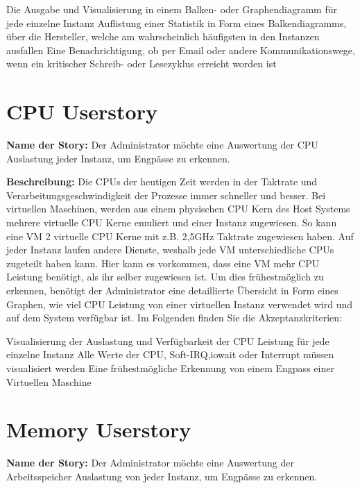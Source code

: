\begin{outline}
  \1 Die Ausgabe und Visualisierung in einem Balken- oder Graphendiagramm
  für jede einzelne Instanz
  \1 Auflistung einer Statistik in Form eines Balkendiagramms, über die
  Hersteller, welche am wahrscheinlich häufigsten in den Instanzen ausfallen
  \1 Eine Benachrichtigung, ob per Email oder andere Kommunikationswege,
  wenn ein kritischer Schreib- oder Lesezyklus erreicht worden ist
\end{outline}
\mr%

\section{CPU Userstory}
\label{section:CPU_Userstory}
\textbf{Name der Story:} Der Administrator möchte eine Auswertung der CPU
Auslastung jeder Instanz, um Engpässe zu erkennen.

\textbf{Beschreibung:} Die CPUs der heutigen Zeit werden in der Taktrate und
Verarbeitungsgeschwindigkeit der Prozesse immer schneller und besser. Bei
virtuellen Maschinen, werden aus einem physischen CPU Kern des Host Systems
mehrere virtuelle CPU Kerne emuliert und einer Instanz zugewiesen. So kann eine
VM 2 virtuelle CPU Kerne mit z.B. 2,5\si{\giga\hertz} Taktrate zugewiesen
haben.  Auf jeder Instanz laufen andere Dienste, weshalb jede VM
unterschiedliche CPUs zugeteilt haben kann. Hier kann es vorkommen, dass eine
VM mehr CPU Leistung benötigt, als ihr selber zugewiesen ist. Um dies
frühestmöglich zu erkennen, benötigt der Administrator eine detaillierte
Übersicht in Form eines Graphen, wie viel CPU Leistung von einer virtuellen
Instanz verwendet wird und auf dem System verfügbar ist. Im Folgenden finden
Sie die Akzeptanzkriterien:

\begin{outline}
  \1 Visualisierung der Auslastung und Verfügbarkeit der CPU Leistung für jede
  einzelne Instanz
  \1 Alle Werte der CPU, \gls{Soft-IRQ},\gls{iowait} oder \gls{Interrupt}
  müssen visualisiert werden
  \1 Eine frühestmögliche Erkennung von einem Engpass einer Virtuellen Maschine
\end{outline}
\mr%

\section{Memory Userstory}
\textbf{Name der Story:} Der Administrator möchte eine Auswertung der
Arbeitsspeicher Auslastung von jeder Instanz, um Engpässe zu erkennen.

